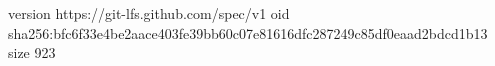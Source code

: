 version https://git-lfs.github.com/spec/v1
oid sha256:bfc6f33e4be2aace403fe39bb60c07e81616dfc287249c85df0eaad2bdcd1b13
size 923
